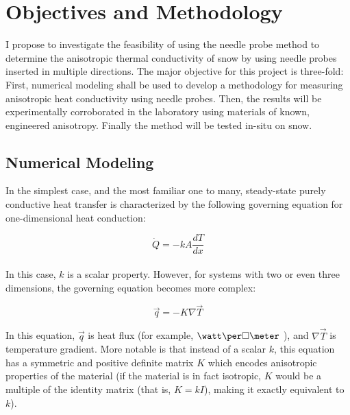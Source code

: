 \documentclass[12pt, letterpaper]{article}
\begin{document}
\section{Objectives and Methodology}

I propose to investigate the feasibility of using the needle probe method to determine the anisotropic thermal conductivity of snow by using needle probes inserted in multiple directions. The major objective for this project is three-fold:  First, numerical modeling shall be used to develop a methodology for measuring anisotropic heat conductivity using needle probes. Then, the results will be experimentally corroborated in the laboratory using materials of known, engineered anisotropy. Finally the method will be tested in-situ on snow.

\subsection{Numerical Modeling}

In the simplest case, and the most familiar one to many, steady-state purely conductive heat transfer is characterized by the following governing equation for one-dimensional heat conduction:

\begin{equation*}
\dot{Q}=-kA\frac{dT}{dx}
\end{equation*}\\

In this case, \(k\) is a scalar property. However, for systems with two or even three dimensions, the governing equation becomes more complex:

\begin{equation*}
\vec{q}=-K \nabla \vec{T}
\end{equation*}

In this equation, \(\vec{q}\) is heat flux (for example, \(\watt \per \square \meter\) ), and \(\nabla \vec{T}\) is temperature gradient. More notable is that instead of a scalar \(k\), this equation has a symmetric and positive definite matrix \(K\) which encodes anisotropic properties of the material (if the material is in fact isotropic, \(K\) would be a multiple of the identity matrix (that is, \(K=kI\)), making it exactly equivalent to \(k\)).
\end{document}
